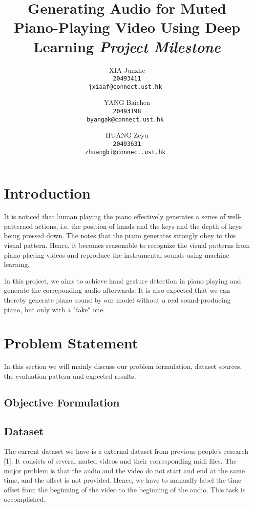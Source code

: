 \documentclass[10pt,twocolumn,letterpaper]{article}
\begin{document}
\title{Generating Audio for Muted Piano-Playing Video Using Deep Learning \newline \newline \textit{Project Milestone}}


\author{XIA Junzhe\\
\tt\small 20493411\\
{\tt\small jxiaaf@connect.ust.hk}
\and
YANG Baichen\\
\tt\small 20493198\\
{\tt\small byangak@connect.ust.hk}
\and
HUANG Zeyu\\
\tt\small 20493631\\
{\tt\small zhuangbi@connect.ust.hk}
}


\maketitle

\section{Introduction}
It is noticed that human playing the piano effectively generates a series of well-patterned actions, 
i.e. the position of hands and the keys and the depth of keys being pressed down. 
The notes that the piano generates strongly obey to this visual pattern. 
Hence, it becomes reasonable to recognize the visual patterns from piano-playing videos and reproduce the instrumental sounds using machine learning.

In this project, we aims to achieve hand gesture detection in piano playing and generate the correponding audio afterwards.
It is also expected that we can thereby generate piano sound by our model without a real sound-producing piano, but only with a "fake" one.

\section{Problem Statement}
In this section we will mainly discuss our problem formulation, dataset sources, the evaluation pattern and expected results.

    \subsection{Objective Formulation}

    \subsection{Dataset}
    The current dataset we have is a external dataset from previous people’s research [1]. 
    It consists of several muted videos and their corresponding midi files. 
    The major problem is that the audio and the video do not start and end at the same time, and the offset is not provided. 
    Hence, we have to manually label the time offset from the beginning of the video to the beginning of the audio. 
    This task is accomplished.
\end{document}

